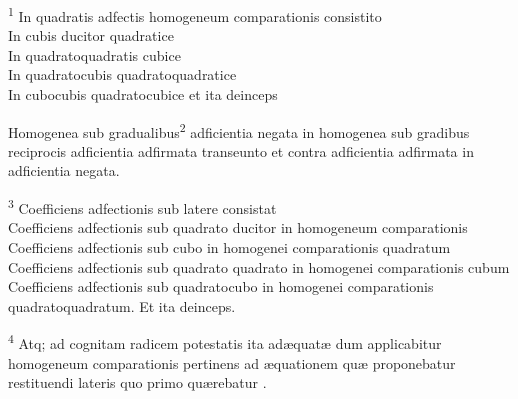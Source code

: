\documentclass[11pt,a4paper]{article}
\begin{document}
\textsuperscript{1} In quadratis adfectis homogeneum comparationis  consistito\\
In cubis ducitor quadratice\\
In quadratoquadratis cubice\\
In quadratocubis quadratoquadratice\\
In cubocubis quadratocubice et ita deinceps

Homogenea sub gradualibus\textsuperscript{2} adficientia negata in homogenea sub gradibus reciprocis adficientia adfirmata transeunto et contra adficientia adfirmata in adficientia negata.

\textsuperscript{3} Coefficiens adfectionis sub latere  consistat\\
Coefficiens adfectionis sub quadrato ducitor in homogeneum comparationis\\
Coefficiens adfectionis sub cubo in homogenei comparationis quadratum\\
Coefficiens adfectionis sub quadrato quadrato in homogenei comparationis cubum\\
Coefficiens adfectionis sub quadratocubo in homogenei comparationis quadratoquadratum. Et ita deinceps.

\textsuperscript{4} Atq; ad cognitam radicem potestatis ita  adæquatæ dum applicabitur homogeneum comparationis pertinens ad æquationem quæ proponebatur restituendi lateris \struck{\ill{}} quo primo quærebatur .
\end{document}
